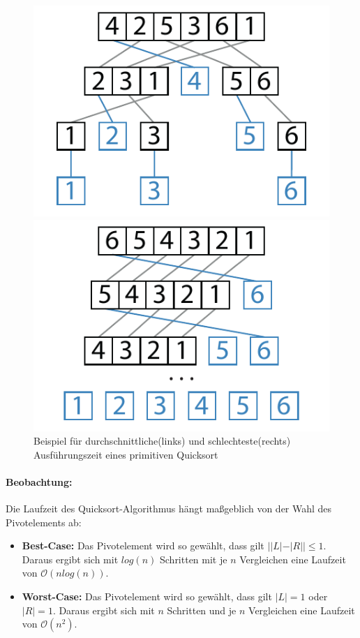\begin{figure}[h]
	\centering
	\begin{minipage}{.45\textwidth}
		\centering
		\includegraphics[width=\textwidth]{Graphics/Quicksort_example_avg}
	\end{minipage}
	\begin{minipage}{.45\textwidth}
		\centering
		\includegraphics[width=\textwidth]{Graphics/Quicksort_example_wcet}
	\end{minipage}
	\caption{Beispiel für durchschnittliche(links) und schlechteste(rechts) Ausführungszeit eines primitiven Quicksort}
	\label{fig:quicksort_example}
\end{figure}

\paragraph{Beobachtung:}
Die Laufzeit des Quicksort-Algorithmus hängt maßgeblich von der Wahl des Pivotelements ab:
\begin{itemize}
	\item \textbf{Best-Case:} Das Pivotelement wird so gewählt, dass gilt $||L| - |R| | \leq 1$. Daraus ergibt sich mit $log(n)$ Schritten mit je $n$ Vergleichen eine Laufzeit von $\mathcal{O}(nlog(n))$.
	\item \textbf{Worst-Case:} Das Pivotelement wird so gewählt, dass gilt $|L| = 1$ oder $|R| = 1$. Daraus ergibt sich mit $n$ Schritten und je $n$ Vergleichen eine Laufzeit von $\mathcal{O}(n^2)$.
\end{itemize}